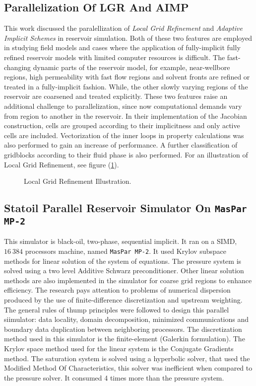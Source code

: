 \documentclass[barcolor=BrickRed,nocopyright,nolists]{asmejour}
\begin{document}
\subsection{Parallelization Of LGR And AIMP}
This work discussed the paralellization of \textit{Local Grid Refinement} and \textit{Adaptive Implicit Schemes} in reservoir simulation. Both of these two features are employed in studying field models and cases where the application of fully-implicit fully refined reservoir models
with limited computer resources is difficult. The fast-changing dynamic parts of the reservoir model, for example, near-wellbore regions, high permeability with fast flow regions and solvent fronts are refined or treated in a fully-implicit fashion. While, the other slowly varying regions
of the reservoir are coarsened and treated explicitly. These two features raise an additional challenge to parallelization, since now computational demands vary from region to another in the reservoir. In their implementation of the Jacobian construction, cells are grouped according to their
implicitness and only active cells are included. Vectorization of the inner loops in property calculations was also performed to gain an increase of performance. A further classification of gridblocks according to their fluid phase is also performed. For an illustration of Local Grid Refinement,
see figure (\ref{lgr}).
\begin{figure}[h]
	\caption{Local Grid Refinement Illustration.}
	\label{lgr}
\end{figure}

\subsection{Statoil Parallel Reservoir Simulator On \texttt{MasPar MP-2}}
This simulator is black-oil, two-phase, sequential implicit. It ran on a SIMD, $16 \ 384$ processors machine, named \texttt{MasPar MP-2}. It used Krylov subspace methods for linear solution of the system of equations. The pressure system is solved using a two level Additive Schwarz preconditioner. Other linear solution
methods are also implemented in the simulator for coarse grid regions to enhance efficiency. The research pays attention to problems of numerical dispersion produced by the use of finite-difference discretization and upstream weighting. The general rules of thump principles were followed to design this parallel siimulator:
data locality, domain decomposition, minimized communications and boundary data duplication between neighboring processors. The discretization method used in this simulator is the finite-element (Galerkin formulation). The Krylov space method used for the linear system is the Conjugate Gradients method. The saturation system
is solved using a hyperbolic solver, that used the Modified Method Of Characteristics, this solver was inefficient when compared to the pressure solver. It consumed 4 times more than the pressure system. 
\end{document}
